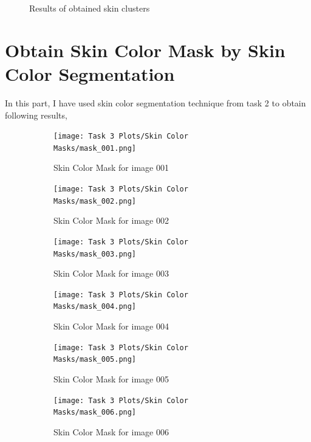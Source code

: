 \documentclass[11pt]{report}
\begin{document}
\begin{figure}[H]
    \caption{Results of obtained skin clusters}
    \label{fig:skinpixelmasksall}
\end{figure}

\section{Obtain Skin Color Mask by Skin Color Segmentation}

In this part, I have used skin color segmentation technique from task 2 to obtain following results,

\begin{figure}[H]
    \centering
    \begin{subfigure}{0.24\textwidth}
        \centering
        \texttt{[image: Task 3 Plots/Skin Color Masks/mask\_001.png]}
        \caption{Skin Color Mask for image 001}
        \label{fig:kskincolormask1}
    \end{subfigure}
    \begin{subfigure}{0.24\textwidth}
        \centering
        \texttt{[image: Task 3 Plots/Skin Color Masks/mask\_002.png]}
        \caption{Skin Color Mask for image 002}
        \label{fig:kskincolormask2}
    \end{subfigure}
    \begin{subfigure}{0.24\textwidth}
        \centering
        \texttt{[image: Task 3 Plots/Skin Color Masks/mask\_003.png]}
        \caption{Skin Color Mask for image 003}
        \label{fig:kskincolormask3}
    \end{subfigure}
    \begin{subfigure}{0.24\textwidth}
        \centering
        \texttt{[image: Task 3 Plots/Skin Color Masks/mask\_004.png]}
        \caption{Skin Color Mask for image 004}
        \label{fig:kskincolormask4}
    \end{subfigure}
    \begin{subfigure}{0.24\textwidth}
        \centering
        \texttt{[image: Task 3 Plots/Skin Color Masks/mask\_005.png]}
        \caption{Skin Color Mask for image 005}
        \label{fig:kskincolormask5}
    \end{subfigure}
    \begin{subfigure}{0.24\textwidth}
        \centering
        \texttt{[image: Task 3 Plots/Skin Color Masks/mask\_006.png]}
        \caption{Skin Color Mask for image 006}
        \label{fig:kskincolormask6}
    \end{subfigure}
    \begin{subfigure}{0.24\textwidth}
        \centering

\end{subfigure}
\end{figure}
\end{document}
